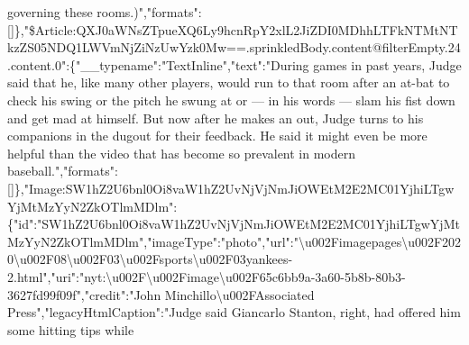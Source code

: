 governing these
rooms.)","formats":{[}{]}\},"\$Article:QXJ0aWNsZTpueXQ6Ly9hcnRpY2xlL2JiZDI0MDhhLTFkNTMtNTkzZS05NDQ1LWVmNjZiNzUwYzk0Mw==.sprinkledBody.content@filterEmpty.24.content.0":\{"\_\_typename":"TextInline","text":"During
games in past years, Judge said that he, like many other players, would
run to that room after an at-bat to check his swing or the pitch he
swung at or --- in his words --- slam his fist down and get mad at
himself. But now after he makes an out, Judge turns to his companions in
the dugout for their feedback. He said it might even be more helpful
than the video that has become so prevalent in modern
baseball.","formats":{[}{]}\},"Image:SW1hZ2U6bnl0Oi8vaW1hZ2UvNjVjNmJiOWEtM2E2MC01YjhiLTgwYjMtMzYyN2ZkOTlmMDlm":\{"id":"SW1hZ2U6bnl0Oi8vaW1hZ2UvNjVjNmJiOWEtM2E2MC01YjhiLTgwYjMtMzYyN2ZkOTlmMDlm","imageType":"photo","url":"\textbackslash{}u002Fimagepages\textbackslash{}u002F2020\textbackslash{}u002F08\textbackslash{}u002F03\textbackslash{}u002Fsports\textbackslash{}u002F03yankees-2.html","uri":"nyt:\textbackslash{}u002F\textbackslash{}u002Fimage\textbackslash{}u002F65c6bb9a-3a60-5b8b-80b3-3627fd99f09f","credit":"John
Minchillo\textbackslash{}u002FAssociated
Press","legacyHtmlCaption":"Judge said Giancarlo Stanton, right, had
offered him some hitting tips while
